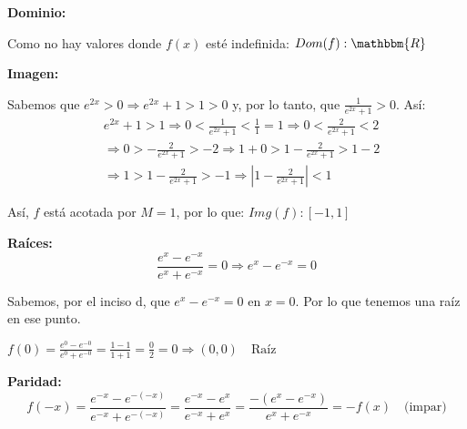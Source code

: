 \documentclass[12pt]{article}
\begin{document}
\begin{enumerate}[\hspace{9px} a)]
        \textbf{Dominio: }\medskip

            Como no hay valores donde $f(x)$ est\'e indefinida: \(Dom(f):\mathbbm{R}\)\medskip

        \textbf{Imagen: }\medskip

            Sabemos que \(e^{2x}>0 \Rightarrow e^{2x}+1>1>0\) y, por lo tanto, que \(\displaystyle\frac{1}{e^{2x}+1}>0\). As\'i:
            \begin{align*}
                &e^{2x}+1>1 \Longrightarrow 0<\frac{1}{e^{2x}+1}<\frac{1}{1}=1 \Longrightarrow  0<\frac{2}{e^{2x}+1}<2 \\
                &\Longrightarrow  0>-\frac{2}{e^{2x}+1}>-2 \Longrightarrow  1+0>1-\frac{2}{e^{2x}+1}>1-2 \\ 
                &\Longrightarrow  1>1-\frac{2}{e^{2x}+1}>-1 \Longrightarrow \left|1-\frac{2}{e^{2x}+1}\right|<1
            \end{align*}

            As\'i, $f$  est\'a acotada por $M=1$, por lo que: \(Img(f): [-1,1]\)\medskip

        \textbf{Ra\'ices: }
            \begin{equation*}
                \frac{e^x-e^{-x}}{e^x+e^{-x}}=0 \Longrightarrow e^x-e^{-x}=0
            \end{equation*}

            Sabemos, por el inciso d, que \(e^x-e^{-x}=0\) en \(x=0\). Por lo que tenemos una ra\'iz en ese punto.\medskip

            \(f(0)=\frac{e^0-e^{-0}}{e^0+e^{-0}} = \frac{1-1}{1+1} = \frac{0}{2} = 0 \Longrightarrow (0,0) \quad \text{Raíz}\)

        \textbf{Paridad: }
            \begin{equation*}
                f(-x) = \frac{e^{-x}-e^{-(-x)}}{e^{-x}+e^{-(-x)}} = \frac{e^{-x}-e^x}{e^{-x}+e^x} = \frac{-(e^x-e^{-x})}{e^x+e^{-x}} = -f(x) \quad \text{(impar)}
            \end{equation*}


\end{enumerate}
\end{document}
